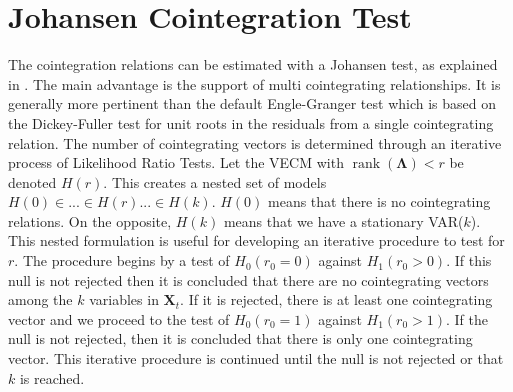 \documentclass[11pt,a4,twosided,singlespacing,titlepagenumber=on]{scrreprt}
\numberwithin{equation}{chapter} %
\theoremstyle{remark}
\DeclareMathOperator{\rank}{rank}
\newcommand{\matr}[1]{\mathbf{#1}}
\begin{document}
\section{Johansen Cointegration Test}
The cointegration relations can be estimated with a Johansen test, as explained in \cite{johansen1988}. The main advantage is the support of multi cointegrating relationships. It is generally more pertinent than the default Engle-Granger test which is based on the Dickey-Fuller test for unit roots in the residuals from a single cointegrating relation. The number of cointegrating vectors is determined through an iterative process of Likelihood Ratio Tests. Let the VECM with $\rank\left(\matr{\Lambda}\right)<r$ be denoted $H(r)$. This creates a nested set of models $H(0) \in ... \in H(r) ... \in H(k)$. $H(0)$ means that there is no cointegrating relations. On the opposite, $H(k)$ means that we have a stationary VAR($k$). This nested formulation is useful for developing an iterative procedure to test for $r$. The procedure begins by a test of $H_0(r_0 = 0)$ against $H_1(r_0 > 0)$. If this null is not rejected then it is concluded that there are no cointegrating vectors among the $k$ variables in $\matr{X}_t$. If it is rejected, there is at least one cointegrating vector and we proceed to the test of $H_0(r_0 = 1)$ against $H_1(r_0 > 1)$. If the null is not rejected, then it is concluded that there is only one cointegrating vector. This iterative procedure is continued until the null is not rejected or that $k$ is reached. \\
\end{document}
